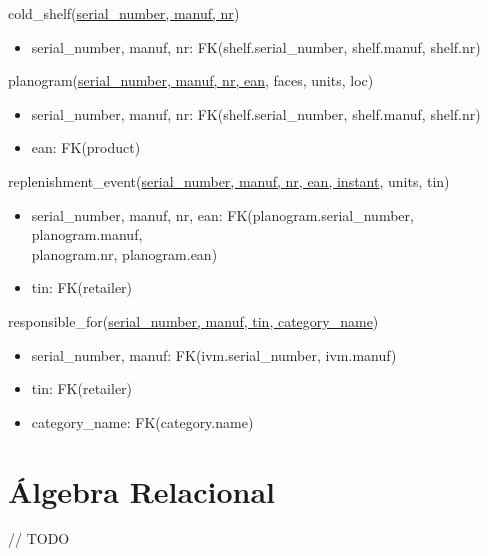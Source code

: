 \documentclass[12pt,a4paper]{article}
\begin{document}
  \vspace*{10pt}
  
  \noindent
  cold\_shelf(\underline{serial\_number, manuf, nr})
  \begin{itemize}[nosep]
    \item serial\_number, manuf, nr: FK(shelf.serial\_number, shelf.manuf, shelf.nr)
  \end{itemize}
  
  \vspace*{10pt}
  
  \noindent
  planogram(\underline{serial\_number, manuf, nr, ean}, faces, units, loc)
  \begin{itemize}[nosep]
    \item serial\_number, manuf, nr: FK(shelf.serial\_number, shelf.manuf, shelf.nr)
    \item ean: FK(product)
  \end{itemize}
  
  \vspace*{10pt}
  
  \noindent
  replenishment\_event(\underline{serial\_number, manuf, nr, ean, instant}, units, tin)
  \begin{itemize}[nosep]
    \item serial\_number, manuf, nr, ean: FK(planogram.serial\_number, planogram.manuf,\\ planogram.nr, planogram.ean)
    \item tin: FK(retailer)
  \end{itemize}
  
  \vspace*{10pt}
  
  \noindent
  responsible\_for(\underline{serial\_number, manuf, tin, category\_name})
  \begin{itemize}[nosep]
    \item serial\_number, manuf: FK(ivm.serial\_number, ivm.manuf)
    \item tin: FK(retailer)
    \item category\_name: FK(category.name)
  \end{itemize}

  \sffamily
  \section*{Álgebra Relacional}
  
  // TODO
\end{document}
